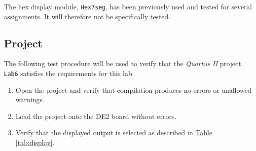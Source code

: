 The hex display module, \verb|Hex7seg|, has been previously used and tested for several assignments.
It will therefore not be specifically tested.

\subsection{Project} %
\label{sub:project_pro}

The following test procedure will be used to verify that the \emph{Quartus II} project \verb|Lab6| satisfies the requirements for this lab.

\begin{enumerate}
    \item Open the project and verify that compilation produces no errors or unallowed warnings.
    \item Load the project onto the DE2 board without errors.
    \item Verify that the displayed output is selected as described in \hyperref[tab:display]{Table \ref*{tab:display}}.
\end{enumerate}


